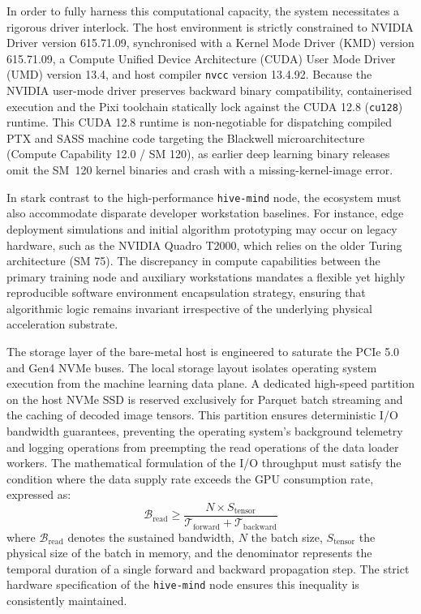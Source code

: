In order to fully harness this computational capacity, the system necessitates a rigorous driver interlock. The host environment is strictly constrained to NVIDIA Driver version 615.71.09, synchronised with a Kernel Mode Driver (KMD) version 615.71.09, a Compute Unified Device Architecture (CUDA) User Mode Driver (UMD) version 13.4, and host compiler \texttt{nvcc} version 13.4.92. Because the NVIDIA user-mode driver preserves backward binary compatibility, containerised execution and the Pixi toolchain statically lock against the CUDA 12.8 (\texttt{cu128}) runtime. This CUDA 12.8 runtime is non-negotiable for dispatching compiled PTX and SASS machine code targeting the Blackwell microarchitecture (Compute Capability 12.0 / SM 120), as earlier deep learning binary releases omit the SM~120 kernel binaries and crash with a missing-kernel-image error.

In stark contrast to the high-performance \texttt{hive-mind} node, the ecosystem must also accommodate disparate developer workstation baselines. For instance, edge deployment simulations and initial algorithm prototyping may occur on legacy hardware, such as the NVIDIA Quadro T2000, which relies on the older Turing architecture (SM 75). The discrepancy in compute capabilities between the primary training node and auxiliary workstations mandates a flexible yet highly reproducible software environment encapsulation strategy, ensuring that algorithmic logic remains invariant irrespective of the underlying physical acceleration substrate.

The storage layer of the bare-metal host is engineered to saturate the PCIe 5.0 and Gen4 NVMe buses. The local storage layout isolates operating system execution from the machine learning data plane. A dedicated high-speed partition on the host NVMe SSD is reserved exclusively for Parquet batch streaming and the caching of decoded image tensors. This partition ensures deterministic I/O bandwidth guarantees, preventing the operating system's background telemetry and logging operations from preempting the read operations of the data loader workers. The mathematical formulation of the I/O throughput must satisfy the condition where the data supply rate exceeds the GPU consumption rate, expressed as:
\[
    \mathcal{B}_{\text{read}} \ge \frac{N \times S_{\text{tensor}}}{\mathcal{T}_{\text{forward}} + \mathcal{T}_{\text{backward}}}
\]
where $\mathcal{B}_{\text{read}}$ denotes the sustained bandwidth, $N$ the batch size, $S_{\text{tensor}}$ the physical size of the batch in memory, and the denominator represents the temporal duration of a single forward and backward propagation step. The strict hardware specification of the \texttt{hive-mind} node ensures this inequality is consistently maintained.

